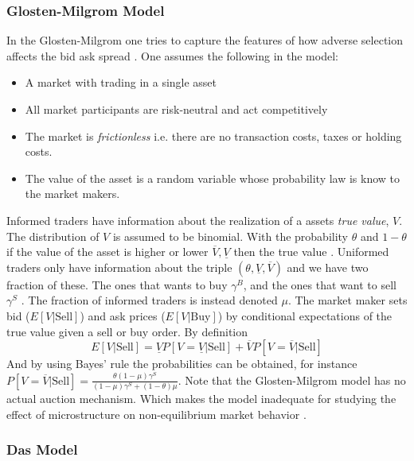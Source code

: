 \documentclass{kththesis}
\theoremstyle{definition}
\begin{document}
\subsubsection*{Glosten-Milgrom Model}
In the Glosten-Milgrom one tries to capture the features of how adverse selection affects the bid ask spread \parencite{darley2007nasdaq}. One assumes the following in the model:
\begin{itemize}
    \item A market with trading in a single asset
    \item All market participants are risk-neutral and act competitively
    \item The market is \textit{frictionless} i.e. there are no transaction costs, taxes or holding costs.
    \item The value of the asset is a random variable whose probability law is know to the market makers.
\end{itemize}
Informed traders have information about the realization of a assets \textit{true value}, $V$. The distribution of $V$ is assumed to be binomial. With the probability $\theta$ and $1- \theta$ if the value of the asset is higher or lower $\overline{V}, \underline{V}$  then the true value \parencite{darley2007nasdaq}. Uniformed traders only have information about the triple $(\theta, \underline{V}, \overline{V})$ and we have two fraction of these. The ones that wants to buy $\gamma^{B}$, and the ones that want to sell $\gamma^{S}$ \parencite{darley2007nasdaq}. The fraction of informed traders is instead denoted $\mu$. The market maker sets bid ($E[V|\text{Sell}]$) and ask prices ($E[V|\text{Buy}]$) by conditional expectations of the true value given a sell or buy order. By definition \parencite{darley2007nasdaq} 
\begin{equation}
    \label{eq:7}
    E[V|\text{Sell}] = \underline{V}P[V=\underline{V}|\text{Sell}] + \overline{V}P[V=\overline{V}|\text{Sell}]
\end{equation}
And by using Bayes' rule the probabilities  can be obtained, for instance $P[V=\overline{V}|\text{Sell}] = \frac{\theta(1-\mu)\gamma^{S}}{(1-\mu)\gamma^{S} + (1-\theta)\mu}$.
Note that the Glosten-Milgrom model has no actual auction mechanism. Which makes the model inadequate for studying the effect of microstructure on non-equilibrium market behavior \parencite{darley2007nasdaq}.

\subsubsection*{Das Model}
\end{document}
